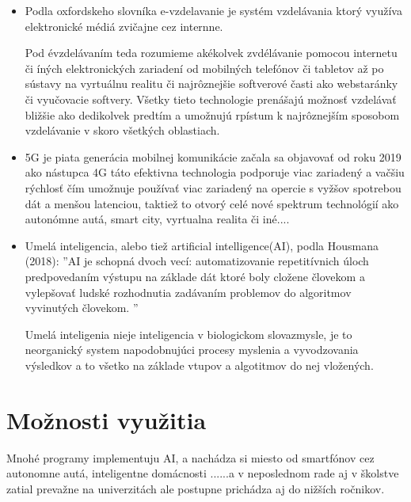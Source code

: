 \documentclass[10pt,oneside,slovak,a4paper]{article}
\begin{document}
\begin{itemize}
\item Podla oxfordskeho slovníka e-vzdelavanie je systém vzdelávania ktorý využíva elektronické médiá zvičajne cez internne. 

Pod évzdelávaním teda rozumieme akékolvek zvdélávanie pomocou internetu či íných elektronických zariadení od mobilných telefónov či tabletov až po sústavy na vyrtuálnu realitu či najrôznejšie softverové časti ako webstaránky či vyučovacie softvery. Všetky tieto technologie prenášajú možnosť vzdelávať bližšie ako dedikolvek predtím a umožnujú rpístum k najrôznejším sposobom vzdelávanie v skoro všetkých oblastiach.

\item 
5G je piata generácia mobilnej komunikácie začala sa objavovať od roku 2019 ako nástupca 4G táto efektivna technologia podporuje viac zariadený a vačšiu rýchlosť čím umožnuje používať viac zariadený na opercie s vyžšov spotrebou dát a menšou latenciou, taktiež to otvorý celé nové spektrum technológií ako autonómne autá, smart city, vyrtualna realita či iné....

\item 
Umelá inteligencia, alebo tiež artificial intelligence(AI), podla Housmana (2018): ''AI je schopná dvoch vecí: automatizovanie repetitívnich úloch predpovedaním výstupu na základe dát ktoré boly cložene človekom a vylepšovať ludské rozhodnutia zadávaním problemov do algoritmov vyvinutých človekom. ''

Umelá inteligenia nieje inteligencia v biologickom slovazmysle, je to neorganický system napodobnujúci procesy myslenia a vyvodzovania výsledkov a to všetko na základe vtupov a algotitmov do nej vložených.  



\end{itemize}

\section{Možnosti využitia} 
Mnohé programy implementuju AI, a nachádza si miesto od smartfónov cez autonomne autá, inteligentne domácnosti ......a v neposlednom rade aj v školstve zatial prevažne na univerzitách ale postupne prichádza aj do nižších ročnikov.
\end{document}
